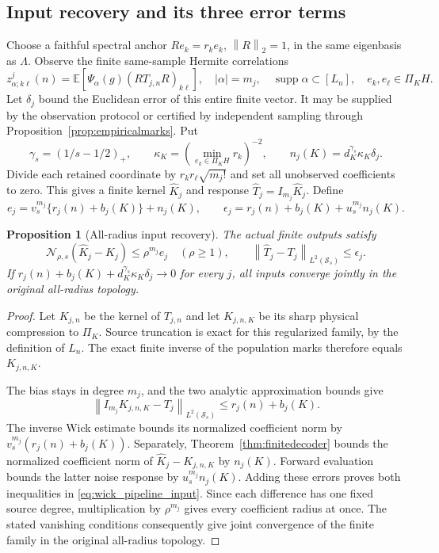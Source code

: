 \documentclass[11pt,a4paper]{amsart}
\numberwithin{equation}{section}
\newtheorem{proposition}[theorem]{Proposition}
\theoremstyle{definition}
\theoremstyle{remark}
\newcommand{\E}{\mathbb E}
\newcommand{\Sch}{\mathcal S}
\newcommand{\norm}[1]{\left\lVert#1\right\rVert}
\newcommand{\Nn}[2]{\mathcal N_{#1,s}(#2)}
\begin{document}
\subsection{Input recovery and its three error terms}
Choose a faithful spectral anchor $Re_k=r_ke_k$, $\norm R_2=1$, in the same eigenbasis as $\Lambda$. Observe the finite same-sample Hermite correlations
\begin{equation}\label{eq:wick_pipeline_marks}
 z^j_{\alpha;k\ell}(n)=\E[\Psi_\alpha(g)(RT_{j,n}R)_{k\ell}],
 \quad |\alpha|=m_j,\quad\operatorname{supp}\alpha\subset[L_n],
 \quad e_k,e_\ell\in\Pi_KH.
\end{equation}
Let $\delta_j$ bound the Euclidean error of this entire finite vector. It may be supplied by the observation protocol or certified by independent sampling through Proposition~\ref{prop:empiricalmarks}. Put
\[
 \gamma_s=(1/s-1/2)_+,\qquad
 \kappa_K=\left(\min_{e_k\in\Pi_KH}r_k\right)^{-2},\qquad
 n_j(K)=d_K^{\gamma_s}\kappa_K\delta_j.
\]
Divide each retained coordinate by $r_kr_\ell\sqrt{m_j!}$ and set all unobserved coefficients to zero. This gives a finite kernel $\widehat K_j$ and response $\widehat T_j=I_{m_j}\widehat K_j$. Define
\begin{equation}\label{eq:wick_input_certificates}
 e_j=v_s^{m_j}\{r_j(n)+b_j(K)\}+n_j(K),\qquad
 \epsilon_j=r_j(n)+b_j(K)+u_s^{m_j}n_j(K).
\end{equation}
\begin{proposition}[All-radius input recovery]\label{prop:wick_pipeline_input}
The actual finite outputs satisfy
\begin{equation}\label{eq:wick_pipeline_input}
 \Nn\rho{\widehat K_j-K_j}\le\rho^{m_j}e_j\quad(\rho\ge1),\qquad
 \norm{\widehat T_j-T_j}_{L^2(\Sch_s)}\le\epsilon_j.
\end{equation}
If $r_j(n)+b_j(K)+d_K^{\gamma_s}\kappa_K\delta_j\to0$ for every $j$, all inputs converge jointly in the original all-radius topology.
\end{proposition}
\begin{proof}
Let $K_{j,n}$ be the kernel of $T_{j,n}$ and let $K_{j,n,K}$ be its sharp physical compression to $\Pi_K$. Source truncation is exact for this regularized family, by the definition of $L_n$. The exact finite inverse of the population marks therefore equals $K_{j,n,K}$.

The bias stays in degree $m_j$, and the two analytic approximation bounds give
\[
 \norm{I_{m_j}K_{j,n,K}-T_j}_{L^2(\Sch_s)}
 \le r_j(n)+b_j(K).
\]
The inverse Wick estimate bounds its normalized coefficient norm by $v_s^{m_j}(r_j(n)+b_j(K))$. Separately, Theorem~\ref{thm:finitedecoder} bounds the normalized coefficient norm of $\widehat K_j-K_{j,n,K}$ by $n_j(K)$. Forward evaluation bounds the latter noise response by $u_s^{m_j}n_j(K)$. Adding these errors proves both inequalities in \eqref{eq:wick_pipeline_input}. Since each difference has one fixed source degree, multiplication by $\rho^{m_j}$ gives every coefficient radius at once. The stated vanishing conditions consequently give joint convergence of the finite family in the original all-radius topology.
\end{proof}
\end{document}
